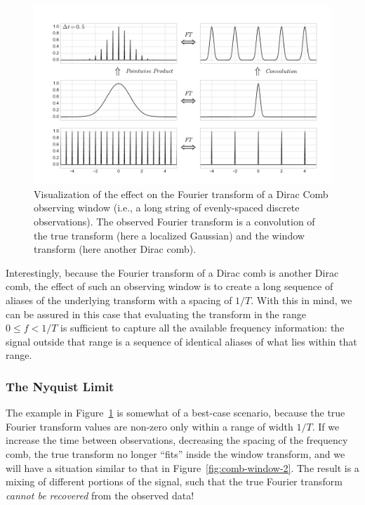 \documentclass[preprint]{aastex}
\newcommand{\fig}[1]{Figure~\ref{fig:#1}}
\newcommand{\figlabel}[1]{\label{fig:#1}}
\newcommand{\sectlabel}[1]{\label{sect:#1}}
\begin{document}
\begin{figure}[ht]
  \centering
  \includegraphics[width=\textwidth]{fig07_comb_window_1}
  \caption{Visualization of the effect on the Fourier transform of a
    Dirac Comb observing window (i.e., a long string of evenly-spaced
    discrete observations). The observed Fourier
    transform is a convolution of the true transform (here a localized
    Gaussian) and the window transform (here another Dirac comb).
    \figlabel{comb-window-1}}
\end{figure}

Interestingly, because the Fourier transform of a Dirac comb is another Dirac
comb, the effect of such an observing window is to create a long sequence
of aliases of the underlying transform with a spacing of $1/T$.
With this in mind, we can be assured in this case that evaluating the
transform in the range $0 \le f < 1/T$ is sufficient to capture
all the available frequency information:
the signal outside that range is a sequence of identical aliases of
what lies within that range.

\subsubsection{The Nyquist Limit}
\sectlabel{nyquist}

The example in \fig{comb-window-1} is somewhat of a best-case scenario, because
the true Fourier transform values are non-zero only within a range of
width $1/T$.
If we increase the time between observations, decreasing the spacing of the
frequency comb, the true transform no longer ``fits'' inside the window
transform, and we will have a situation similar to that in \fig{comb-window-2}.
The result is a mixing of different portions of the signal, such that
the true Fourier transform {\it cannot be recovered}
from the observed data!
\end{document}
